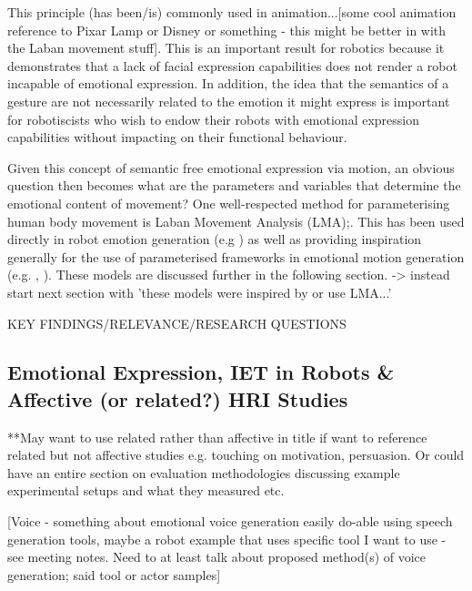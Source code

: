 \documentclass[11pt]{article}
\begin{document}
This principle (has been/is) commonly used in animation...[some cool animation reference to Pixar Lamp or Disney or something - this might be better in with the Laban movement stuff]. This is an important result for robotics because it demonstrates that a lack of facial expression capabilities does not render a robot incapable of emotional expression. In addition, the idea that the semantics of a gesture are not necessarily related to the emotion it might express is important for robotiscists who wish to endow their robots with emotional expression capabilities without impacting on their functional behaviour. 

Given this concept of semantic free emotional expression via motion, an obvious question then becomes what are the parameters and variables that determine the emotional content of movement? One well-respected method for parameterising human body movement is Laban Movement Analysis (LMA);. This has been used directly in robot emotion generation (e.g \cite{masuda2010motion}) as well as providing inspiration generally for the use of parameterised frameworks in emotional motion generation (e.g. \cite{lim2011converting}, \cite{xu2013mood}). These models are discussed further in the following section. -> instead start next section with 'these models were inspired by or use LMA...'

KEY FINDINGS/RELEVANCE/RESEARCH QUESTIONS

\subsection{Emotional Expression, IET in Robots \& Affective (or related?) HRI Studies}

**May want to use related rather than affective in title if want to reference related but not affective studies e.g. touching on motivation, persuasion. Or could have an entire section on evaluation methodologies discussing example experimental setups and what they measured etc. 

[Voice - something about emotional voice generation easily do-able using speech generation tools, maybe a robot example that uses specific tool I want to use - see meeting notes. Need to at least talk about proposed method(s) of voice generation; said tool or actor samples]
\end{document}
